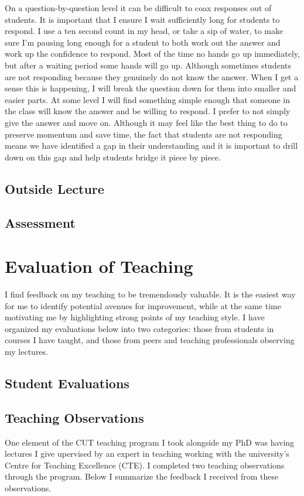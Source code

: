 \documentclass{article}
\begin{document}
On a question-by-question level it can be difficult to coax responses out of students. It is important that I ensure I wait sufficiently long for students to respond. I use a ten second count in my head, or take a sip of water, to make sure I'm pausing long enough for a student to both work out the answer and work up the confidence to respond. Most of the time no hands go up immediately, but after a waiting period some hands will go up. Although sometimes students are not responding because they genuinely do not know the answer. When I get a sense this is happening, I will break the question down for them into smaller and easier parts. At some level I will find something simple enough that someone in the class will know the answer and be willing to respond. I prefer to not simply give the answer and move on. Although it may feel like the best thing to do to preserve momentum and save time, the fact that students are not responding means we have identified a gap in their understanding and it is important to drill down on this gap and help students bridge it piece by piece.

\subsection{Outside Lecture}

\subsection{Assessment}

\section{Evaluation of Teaching}
I find feedback on my teaching to be tremendously valuable. It is the easiest way for me to identify potential avenues for improvement, while at the same time motivating me by highlighting strong points of my teaching style. I have organized my evaluations below into two categories: those from students in courses I have taught, and those from peers and teaching professionals observing my lectures.
\subsection{Student Evaluations}
\subsection{Teaching Observations}
One element of the CUT teaching program I took alongside my PhD was having lectures I give upervised by an expert in teaching working with the university's Centre for Teaching Excellence (CTE). I completed two teaching observations through the program. Below I summarize the feedback I received from these observations.
\end{document}
